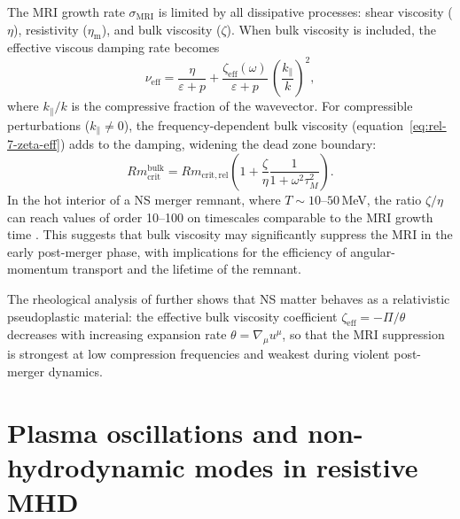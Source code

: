 The MRI growth rate $\sigma_{\mathrm{MRI}}$ is limited by all
dissipative processes: shear viscosity ($\eta$), resistivity
($\eta_{\mathrm{m}}$), and bulk viscosity ($\zeta$).  When bulk
viscosity is included, the effective viscous damping rate becomes
\begin{equation}
\label{eq:rel-9-nu-eff}
\nu_{\mathrm{eff}} = \frac{\eta}{\varepsilon+p}
  + \frac{\zeta_{\mathrm{eff}}(\omega)}{\varepsilon+p}\,
  \left(\frac{k_{\parallel}}{k}\right)^{2},
\end{equation}
where $k_{\parallel}/k$ is the compressive fraction of the wavevector.
For compressible perturbations ($k_{\parallel}\neq 0$), the
frequency-dependent bulk viscosity (equation~\eqref{eq:rel-7-zeta-eff})
adds to the damping, widening the dead zone boundary:
\begin{equation}
\label{eq:rel-9-Rm-bulk}
Rm_{\mathrm{crit}}^{\mathrm{bulk}}
= Rm_{\mathrm{crit,rel}}\left(
  1 + \frac{\zeta}{\eta}\frac{1}{1+\omega^{2}\tau_{M}^{2}}
  \right).
\end{equation}
In the hot interior of a NS merger remnant, where $T\sim 10$--$50\,$MeV,
the ratio $\zeta/\eta$ can reach values of order 10--100 on timescales
comparable to the MRI growth time
\citep{GavassinoBulkViscosity2020,CamelioGavassinoBulkII2022}.  This
suggests that bulk viscosity may significantly suppress the MRI in the
early post-merger phase, with implications for the efficiency of
angular-momentum transport and the lifetime of the remnant.

The rheological analysis of \citet{GavassinoNoronhaRheology2023}
further shows that NS matter behaves as a relativistic pseudoplastic
material: the effective bulk viscosity coefficient
$\zeta_{\mathrm{eff}} = -\Pi/\theta$ decreases with increasing
expansion rate $\theta = \nabla_{\mu}u^{\mu}$, so that the MRI
suppression is strongest at low compression frequencies and weakest
during violent post-merger dynamics.

\section{Plasma oscillations and non-hydrodynamic modes in resistive MHD}
\label{sec:rel-9-plasma-oscillations}

